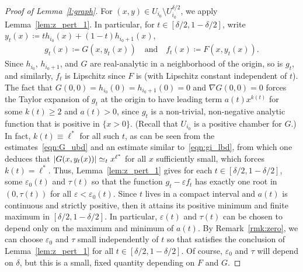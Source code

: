\documentclass[AHL,Unicode,longabstracts,published]{cedram}
\newcommand{\abs}[1]{\left \lvert #1 \right \rvert}
\renewcommand{\epsilon}{\varepsilon}
\let\originalleft\left
\let\originalright\right
\renewcommand{\left}{\mathopen{}\mathclose\bgroup\originalleft}
\renewcommand{\right}{\aftergroup\egroup\originalright}
\begin{document}
\begin{proof}[Proof of Lemma~\ref{l:graph}]
For $(x,y) \in U_{i_0} \setminus U_{i_0}^{\delta/2}$, we apply Lemma~\ref{lem:z_pert_1}. In particular, for $t \in [\delta/2, 1- \delta/2]$, write $y_t(x) \coloneqq t h_{i_0}(x) + (1-t) h_{i_0+1}(x)$,
\begin{align*}
g_t(x) \coloneqq G(x, y_t(x)) \quad\text{and}\quad f_t(x) \coloneqq F(x, y_t(x)).
\end{align*}
Since $h_{i_0}$, $h_{i_0+1}$, and $G$ are real-analytic in a neighborhood of the origin, so is $g_t$, and similarly, $f_t$ is Lipschitz since $F$ is (with Lipschitz constant independent of $t$). The fact that $G(0,0) = h_{i_0}(0) = h_{i_0+1}(0) = 0$ and $\nabla G(0,0) =0$ forces the Taylor expansion of $g_t$ at the origin to have leading term $a(t) x^{k(t)}$ for some $k(t) \ge 2$ and $a(t) >0$, since $g_t$ is a non-trivial, non-negative analytic function that is positive in $\{x >0\}$. (Recall that $U_{i_0}$ is a positive chamber for $G$.) In fact, $k(t) \equiv \ell^*$ for all such $t$, as can be seen from the estimates~\eqref{eqn:G_ubd} and an estimate similar to~\eqref{eqn:gi_lbd}, from which one deduces that $\abs{G(x, y_t(x))} \simeq_t x^{\ell^*}$ for all $x$ sufficiently small, which forces $k(t) = \ell^*$. Thus, Lemma~\ref{lem:z_pert_1} gives for each $t \in [\delta/2, 1 -\delta/2]$, some $\epsilon_0(t)$ and $\tau(t)$ so that the function $g_t - \epsilon f_t$ has exactly one root in $(0, \tau(t))$ for all $\epsilon < \epsilon_0(t)$. Since $t$ lives in a compact interval and $a(t)$ is continuous and strictly positive, then it attains its positive minimum and finite maximum in $[\delta/2, 1-\delta/2]$. In particular, $\epsilon(t)$ and $\tau(t)$ can be chosen to depend only on the maximum and minimum of $a(t)$. By Remark~\ref{rmk:zero}, we can choose $\epsilon_0$ and $\tau$ small independently of $t$ so that satisfies the conclusion of Lemma~\ref{lem:z_pert_1} for all $t \in [\delta/2, 1-\delta/2]$. Of course, $\epsilon_0$ and $\tau$ will depend on $\delta$, but this is a small, fixed quantity depending on $F$ and $G$.


\end{proof}
\end{document}

